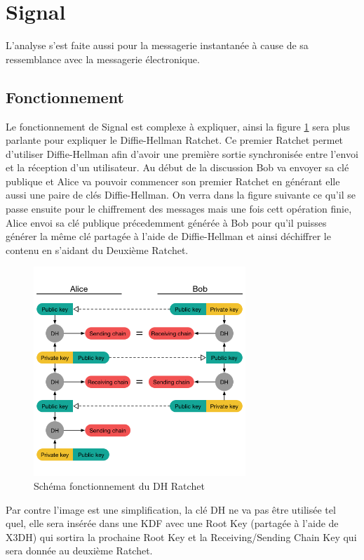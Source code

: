 \section{Signal}
L'analyse s'est faite aussi pour la messagerie instantanée à cause de sa ressemblance avec la messagerie électronique. 
\subsection{Fonctionnement}
Le fonctionnement de Signal est complexe à expliquer, ainsi la figure \ref{fig:signal} sera plus parlante pour expliquer le Diffie-Hellman Ratchet. Ce premier Ratchet permet d'utiliser Diffie-Hellman afin d'avoir une première sortie synchronisée entre l'envoi et la réception d'un utilisateur. Au début de la discussion Bob va envoyer sa clé publique et Alice va pouvoir commencer son premier Ratchet en générant elle aussi une paire de clés Diffie-Hellman. On verra dans la figure suivante ce qu'il se passe ensuite pour le chiffrement des messages mais une fois cett opération finie, Alice envoi sa clé publique précedemment générée à Bob pour qu'il puisses générer la même clé partagée à l'aide de Diffie-Hellman et ainsi déchiffrer le contenu en s'aidant du Deuxième Ratchet.
\begin{figure}[h!]
	\centering
	\includegraphics[width=8cm]{images/signalFonctionnement.png}
	\caption{Schéma fonctionnement du DH Ratchet\cite{doubleratchet}}
	\label{fig:signal}
\end{figure}
Par contre l'image est une simplification, la clé DH ne va pas être utilisée tel quel, elle sera insérée dans une KDF avec une Root Key (partagée à l'aide de X3DH) qui sortira la prochaine Root Key et la Receiving/Sending Chain Key qui sera donnée au deuxième Ratchet.\\
